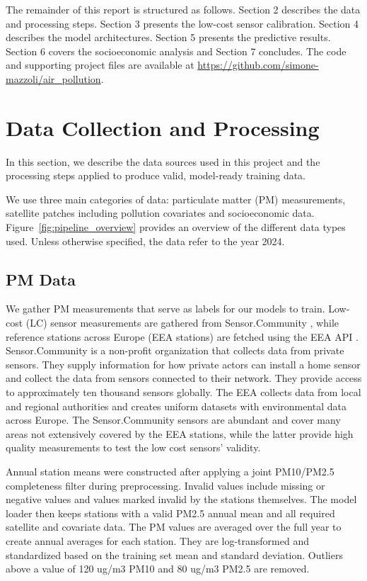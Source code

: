\documentclass[english, a4paper]{article}
\begin{document}

The remainder of this report is structured as follows. Section 2 describes the data and processing steps. Section 3 presents the low-cost sensor calibration. Section 4 describes the model architectures. Section 5 presents the predictive results. Section 6 covers the socioeconomic analysis and Section 7 concludes. The code and supporting project files are available at \url{https://github.com/simone-mazzoli/air_pollution}.

\section{Data Collection and Processing}

In this section, we describe the data sources used in this project and the processing steps applied to produce valid, model-ready training data.

We use three main categories of data: particulate matter (PM) measurements, satellite patches including pollution covariates and socioeconomic data. Figure~\ref{fig:pipeline_overview} provides an overview of the different data types used. Unless otherwise specified, the data refer to the year 2024.


\subsection{PM Data}

We gather PM measurements that serve as labels for our models to train. Low-cost (LC) sensor measurements are gathered from Sensor.Community \citep{sensorcommunity2026}, while reference stations across Europe (EEA stations) are fetched using the EEA API \citep{eea_aqereporting}. Sensor.Community is a non-profit organization that collects data from private sensors. They supply information for how private actors can install a home sensor and collect the data from sensors connected to their network. They provide access to approximately ten thousand sensors globally. The EEA collects data from local and regional authorities and creates uniform datasets with environmental data across Europe. The Sensor.Community sensors are abundant and cover many areas not extensively covered by the EEA stations, while the latter provide high quality measurements to test the low cost sensors' validity.


Annual station means were constructed after applying a joint PM10/PM2.5 completeness filter during preprocessing. Invalid values include missing or negative values and values marked invalid by the stations themselves. The model loader then keeps stations with a valid PM2.5 annual mean and all required satellite and covariate data. The PM values are averaged over the full year to create annual averages for each station. They are log-transformed and standardized based on the training set mean and standard deviation. Outliers above a value of 120 ug/m3 PM10 and 80 ug/m3 PM2.5 are removed.
\end{document}
